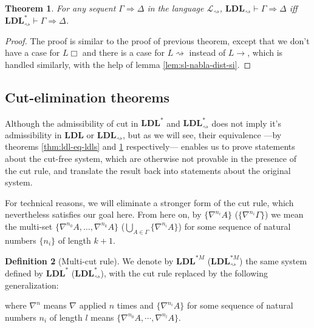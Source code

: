 \documentclass[12pt,a4paper]{article}
\theoremstyle{plain}
\newtheorem{thm}{Theorem}[section]
\theoremstyle{definition}
\newtheorem{dfn}[thm]{Definition}
\begin{document}
\begin{thm}\label{thm:sldl-eq-sldls}
	For any sequent $\Gamma \Rightarrow \Delta$ in the language $\mathcal{L}_{\rightsquigarrow}$, $\mathbf{LDL}_{\rightsquigarrow} \vdash \Gamma \Rightarrow \Delta$ iff $\mathbf{LDL}^*_{\rightsquigarrow} \vdash \Gamma \Rightarrow \Delta$.
\end{thm}
\begin{proof}
	The proof is similar to the proof of previous theorem, except that we don't have a case for $L\Box$ and there is a case for $L\rightsquigarrow$ instead of $L\rightarrow$, which is handled similarly, with the help of lemma \ref{lem:sl-nabla-dist-si}.
\end{proof}

\subsection{Cut-elimination theorems}
Although the admissibility of cut in $\mathbf{LDL}^*$ and $\mathbf{LDL}^*_{\rightsquigarrow}$ does not imply it's admissibility in $\mathbf{LDL}$ or $\mathbf{LDL}_{\rightsquigarrow}$, but as we will see, their equivalence ---by theorems \ref{thm:ldl-eq-ldls} and \ref{thm:sldl-eq-sldls} respectively--- enables us to prove statements about the cut-free system, which are otherwise not provable in the presence of the cut rule, and translate the result back into statements about the original system.

For technical reasons, we will eliminate a stronger form of the cut rule, which nevertheless satisfies our goal here. From here on, by $\{\nabla^{n_i} A\}$ ($\{\nabla^{n_i} \Gamma\}$) we mean the multi-set $\{ \nabla^{n_0} A, \dots, \nabla^{n_k} A \}$ ($\bigcup_{A \in \Gamma} \{\nabla^{n_i} A\}$) for some sequence of natural numbers $\{n_i\}$ of length $k+1$.

\begin{dfn}[Multi-cut rule] We denote by $\mathbf{LDL}^{*M}$ ($\mathbf{LDL}^{*M}_{\rightsquigarrow}$) the same system defined by $\mathbf{LDL}^*$ ($\mathbf{LDL}^*_{\rightsquigarrow}$), with the cut rule replaced by the following generalization:
\begin{prooftree}
\end{prooftree}
where $\nabla^n$ means $\nabla$ applied $n$ times and $\{\nabla^{n_i} A\}$ for some sequence of natural numbers $n_i$ of length $l$ means $\{\nabla^{n_0} A,\dotsb, \nabla^{n_l} A\}$.
\end{dfn}
\end{document}
